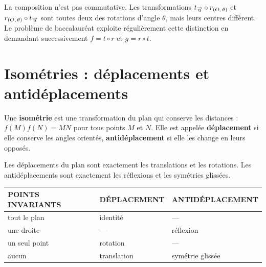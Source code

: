 \begin{avertissement}
La composition n'est pas commutative. Les transformations
$t_{\overrightarrow{u}} \circ r_{(O,\,\theta)}$ et $r_{(O,\,\theta)} \circ t_{\overrightarrow{u}}$ sont
toutes deux des rotations d'angle $\theta$, mais leurs centres diffèrent. Le
problème de baccalauréat exploite régulièrement cette distinction en
demandant successivement $f = t \circ r$ et $g = r \circ t$.
\end{avertissement}

\section{Isométries : déplacements et antidéplacements}

\begin{definition}[isométrie]
Une \textbf{isométrie} est une transformation du plan qui conserve les
distances : $f(M)f(N) = MN$ pour tous points $M$ et $N$. Elle est appelée
\textbf{déplacement} si elle conserve les angles orientés,
\textbf{antidéplacement} si elle les change en leurs opposés.
\end{definition}

\begin{theoreme}
Les déplacements du plan sont exactement les translations et les rotations.
Les antidéplacements sont exactement les réflexions et les symétries
glissées.
\end{theoreme}

\begin{propriete}
\begin{center}
\setlength{\tabcolsep}{9pt}
\renewcommand{\arraystretch}{1.25}
\begin{tabular}{@{}lll@{}}
\toprule
\textsf{\footnotesize\bfseries POINTS INVARIANTS} &
\textsf{\footnotesize\bfseries DÉPLACEMENT} &
\textsf{\footnotesize\bfseries ANTIDÉPLACEMENT} \\
\midrule
tout le plan & identité & — \\
une droite   & — & réflexion \\
un seul point & rotation & — \\
aucun & translation & symétrie glissée \\
\bottomrule
\end{tabular}
\end{center}
\end{propriete}

